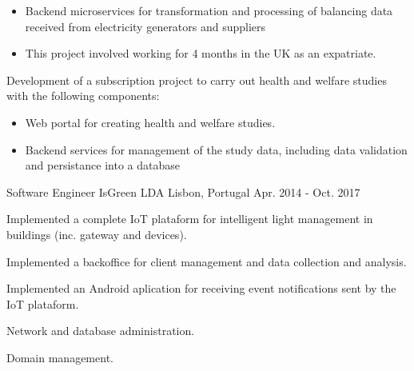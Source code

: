 \begin{cventries}
{\begin{cvitems}
        \begin{itemize}
            \item {Backend microservices for transformation and processing of balancing data received from electricity generators and suppliers}
            \item {This project involved working for 4 months in the UK as an expatriate.}
        \end{itemize}
        \item {Development of a subscription project to carry out health and welfare studies with the following components:}
        \begin{itemize}
            \item {Web portal for creating health and welfare studies.}
            \item {Backend services for management of the study data, including data validation and persistance into a database}
        \end{itemize}
    \end{cvitems}
}

\cventry
{Software Engineer } %
{IsGreen LDA} %
{Lisbon, Portugal} %
{Apr. 2014 - Oct. 2017} %
{ %
    \begin{cvitems}
        \item {Implemented a complete IoT plataform for intelligent light management in buildings (inc. gateway and devices).}
        \item {Implemented a backoffice for client management and data collection and analysis.}
        \item {Implemented an Android aplication for receiving event notifications sent by the IoT plataform.}
        \item {Network and database administration.}
        \item {Domain management.}
    \end{cvitems}
}

\end{cventries}